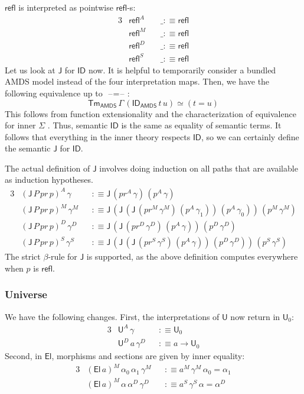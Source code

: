 \documentclass[12pt,a4paper,twoside,openany]{book}
\theoremstyle{remark}
\theoremstyle{definition}
\theoremstyle{theorem}
\newcommand{\mi}[1]{\mathit{#1}}
\newcommand{\ms}[1]{\mathsf{#1}}
\newcommand{\J}{\ms{J}}
\newcommand{\refl}{\mathsf{refl}}
\newcommand{\Tm}{\mathsf{Tm}}
\newcommand{\U}{\mathsf{U}}
\newcommand{\El}{\mathsf{El}}
\newcommand{\ID}{\mathsf{ID}}
\newcommand{\blank}{\mathord{\hspace{1pt}\text{--}\hspace{1pt}}}
\newcommand{\defn}{:\equiv}
\begin{document}
$\refl$ is interpreted as pointwise $\refl$-s:
\begin{alignat*}{3}
  &\refl^A\,&&\_ \defn \refl\\
  &\refl^M\,&&\_ \defn \refl\\
  &\refl^D\,&&\_ \defn \refl\\
  &\refl^S\,&&\_ \defn \refl
\end{alignat*}
Let us look at $\J$ for $\ID$ now. It is helpful to temporarily consider a bundled
AMDS model instead of the four interpretation maps. Then, we have the following
equivalence up to $\blank\!=\!\blank$:
\[\Tm_{\ms{AMDS}}\,\Gamma\,(\ID_{\ms{AMDS}}\,t\,u) \simeq (t = u)\]
This follows from function extensionality and the characterization of
equivalence for inner $\Sigma$ \cite[Section~2.7]{hottbook}. Thus, semantic
$\ID$ is the same as equality of semantic terms. It follows that everything in
the inner theory respects $\ID$, so we can certainly define the semantic $\J$
for $\ID$.

The actual definition of $\J$ involves doing induction on all paths that
are available as induction hypotheses.
\begin{alignat*}{3}
  &(\J\,P\,\mi{pr}\,p)^A\,\gamma   &&\defn \J\,(\mi{pr}^A\,\gamma)\,(p^A\,\gamma)\\
  &(\J\,P\,\mi{pr}\,p)^M\,\gamma^M &&\defn
    \J\,(\J\,(\J\,(\mi{pr}^M\,\gamma^M)\,(p^A\,\gamma_1))\,(p^A\,\gamma_0))\,(p^M\,\gamma^M)\\
  &(\J\,P\,\mi{pr}\,p)^D\,\gamma^D &&\defn \J\,(\J\,(\mi{pr}^D\,\gamma^D)\,(p^A\,\gamma))\,(p^D\,\gamma^D)\\
  &(\J\,P\,\mi{pr}\,p)^S\,\gamma^S &&\defn
    \J\,(\J\,(\J\,(\mi{pr}^S\,\gamma^S)\,(p^A\,\gamma))\,(p^D\,\gamma^D))\,(p^S\,\gamma^S)
\end{alignat*}
The strict $\beta$-rule for $\J$ is supported, as the above definition computes
everywhere when $p$ is $\refl$.


\subsubsection{Universe}
We have the following changes. First, the interpretations of $\U$ now return in
$\U_0$:
\begin{alignat*}{3}
  & \U^A\,\gamma &&\defn \U_0\\
  & \U^D\,a\,\gamma^D &&\defn a \to \U_0
\end{alignat*}
Second, in $\El$, morphisms and sections are given by inner equality:
\begin{alignat*}{3}
  & (\El\,a)^M\,\alpha_0\,\alpha_1\,\gamma^M &&\defn a^M\,\gamma^M\,\alpha_0 = \alpha_1\\
  & (\El\,a)^M\,\alpha\,\alpha^D\,\gamma^D &&\defn a^S\,\gamma^S\,\alpha = \alpha^D
\end{alignat*}
\end{document}
